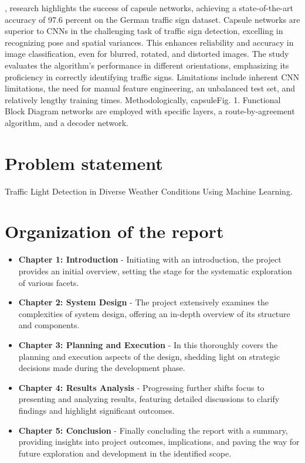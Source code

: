 \documentclass[12 pt]{report}
\begin{document}
{  \hspace*{1cm}{\bfseries  Amara Dinesh’s}, research highlights the success of capsule networks, achieving a state-of-the-art accuracy of 97.6 percent on the German traffic sign dataset. Capsule networks are superior to CNNs in the challenging task of traffic sign detection, excelling in recognizing pose and spatial variances. This enhances reliability and accuracy in image classification, even for blurred, rotated, and distorted images. The study evaluates the algorithm’s performance in different orientations, emphasizing its proficiency in correctly identifying traffic signs. Limitations include inherent CNN limitations, the need for manual feature engineering, an unbalanced test set, and relatively lengthy training times. Methodologically, capsuleFig. 1. Functional Block Diagram networks are employed with specific layers, a route-by-agreement algorithm, and a decoder network.
 }

\section{Problem statement}
Traffic Light Detection in Diverse Weather Conditions Using Machine Learning.
\section{Organization of the report}
\justify

\begin{itemize}
  \item \textbf{Chapter 1: Introduction}
        - Initiating with an introduction, the project provides an initial overview, setting the stage for the systematic exploration of various facets.

  \item \textbf{Chapter 2: System Design}
        - The project extensively examines the complexities of system design, offering an in-depth overview of its structure and components.

  \item \textbf{Chapter 3: Planning and Execution}
        - In this thoroughly covers the planning and execution aspects of the design, shedding light on strategic decisions made during the development phase.

  \item \textbf{Chapter 4: Results Analysis}
        - Progressing further shifts focus to presenting and analyzing results, featuring detailed discussions to clarify findings and highlight significant outcomes.

  \item \textbf{Chapter 5: Conclusion}
        - Finally concluding the report with a summary, providing insights into project outcomes, implications, and paving the way for future exploration and development in the identified scope.
\end{itemize}
\end{document}

